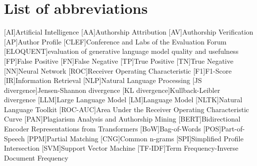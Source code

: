 \chapter*{List of abbreviations}

\begin{acronym}[XXXXXXXXX]
    [AI]{Artificial Intelligence}
    [AA]{Authorship Attribution}
    [AV]{Authorship Verification}
    [AP]{Author Profile}
    [CLEF]{Conference and Labs of the Evaluation Forum}
    [ELOQUENT]{evaluation of generative language model quality and usefulness}
    [FP]{False Positive}
    [FN]{False Negative}
    [TP]{True Positive}
    [TN]{True Negative}
    [NN]{Neural Network}
    [ROC]{Receiver Operating Characteristic}
    [F1]{F1-Score}
    [IR]{Information Retrieval}
    [NLP]{Natural Language Processing}
    [JS divergence]{Jensen-Shannon divergence}
    [KL divergence]{Kullback-Leibler divergence}
    [LLM]{Large Language Model}
    [LM]{Language Model}
    [NLTK]{Natural Language Toolkit}
    [ROC-AUC]{Area Under the Receiver Operating Characteristic Curve}
    [PAN]{Plagiarism Analysis and Authorship Mining} %
    [BERT]{Bidirectional Encoder Representations from Transformers}
    [BoW]{Bag-of-Words}
    [POS]{Part-of-Speech}
    [PPM]{Partial Matching}
    [CNG]{Common n-grams}
    [SPI]{Simplified Profile Intersection}
    [SVM]{Support Vector Machine}
    [TF-IDF]{Term Frequency-Inverse Document Frequency}

\end{acronym}

